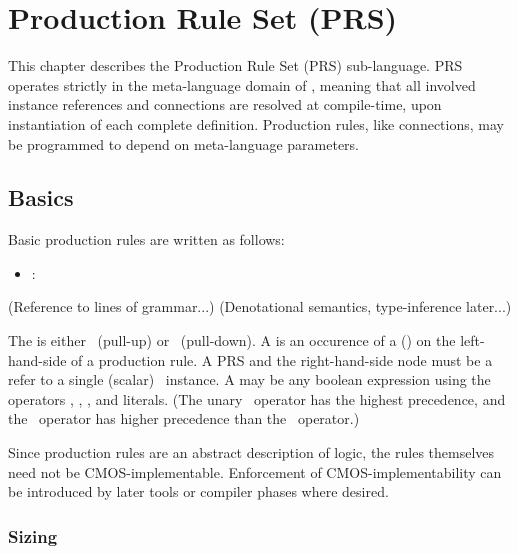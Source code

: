 

\chapter{Production Rule Set (PRS)}
\label{sec:prs}

This chapter describes the Production Rule Set (PRS) sub-language.  
PRS operates strictly in the meta-language domain of \hac, 
meaning that all involved instance references and connections are resolved
at compile-time, upon instantiation of each complete definition.  
Production rules, like connections, may be programmed to depend
on meta-language parameters.  

\section{Basics}
\label{sec:prs:basics}

Basic production rules are written as follows:

\begin{itemize}
\item {} :  \prsrarrow\  
\end{itemize}

(Reference to lines of grammar...)
(Denotational semantics, type-inference later...)

The  is either \prsup\ (pull-up) or \prsdn\ (pull-down).  
A  is an occurence of a (\bool)  on the
left-hand-side of a production rule.  
A PRS  and the right-hand-side node
must be a refer to a single (scalar) \bool\ instance.  
A  may be any boolean expression using the 
operators \prsnot, \prsand, \prsor, and literals.  
(The unary \prsnot\ operator has the highest precedence, 
and the \prsand\ operator has higher precedence than the \prsor\ operator.)

Since production rules are an abstract description of logic, 
the rules themselves need not be CMOS-implementable.  
Enforcement of CMOS-implementability can be introduced by later tools
or compiler phases where desired.  

\subsection{Sizing}
\label{sec:prs:basics:sizing}

